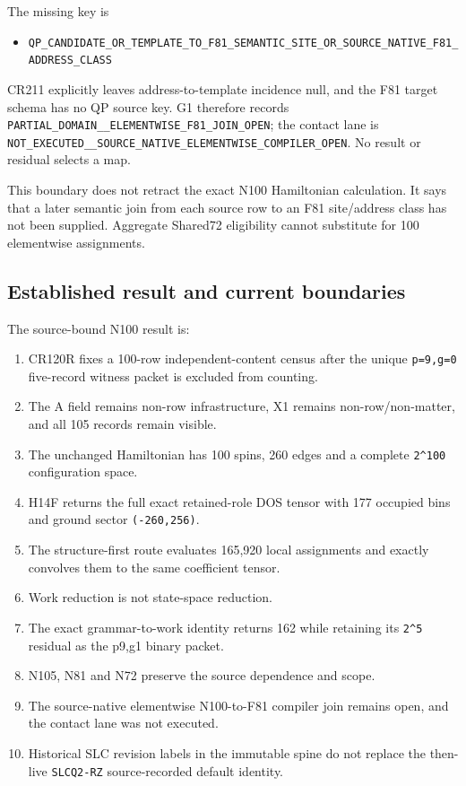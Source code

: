 The missing key is

\begin{itemize}
\tightlist
\item
  \nolinkurl{QP_CANDIDATE_OR_TEMPLATE_TO_F81_SEMANTIC_SITE_OR_SOURCE_NATIVE_F81_ADDRESS_CLASS}
\end{itemize}

CR211 explicitly leaves address-to-template incidence null, and the F81
target schema has no QP source key. G1 therefore records
\nolinkurl{PARTIAL_DOMAIN__ELEMENTWISE_F81_JOIN_OPEN}; the contact
lane is
\nolinkurl{NOT_EXECUTED__SOURCE_NATIVE_ELEMENTWISE_COMPILER_OPEN}.
No result or residual selects a map.

This boundary does not retract the exact N100 Hamiltonian calculation.
It says that a later semantic join from each source row to an F81
site/address class has not been supplied. Aggregate Shared72 eligibility
cannot substitute for 100 elementwise assignments.

\subsection{Established result and current
boundaries}\label{viii-ch01-established-result-and-current-boundaries}

The source-bound N100 result is:

\begin{enumerate}
\def\labelenumi{\arabic{enumi}.}
\tightlist
\item
  CR120R fixes a 100-row independent-content census after the unique
  \texttt{p=9,g=0} five-record witness packet is excluded from counting.
\item
  The A field remains non-row infrastructure, X1 remains
  non-row/non-matter, and all 105 records remain visible.
\item
  The unchanged Hamiltonian has 100 spins, 260 edges and a complete
  \texttt{2\^{}100} configuration space.
\item
  H14F returns the full exact retained-role DOS tensor with 177 occupied
  bins and ground sector \texttt{(-260,256)}.
\item
  The structure-first route evaluates 165,920 local assignments and
  exactly convolves them to the same coefficient tensor.
\item
  Work reduction is not state-space reduction.
\item
  The exact grammar-to-work identity returns 162 while retaining its
  \texttt{2\^{}5} residual as the p9,g1 binary packet.
\item
  N105, N81 and N72 preserve the source dependence and scope.
\item
  The source-native elementwise N100-to-F81 compiler join remains open,
  and the contact lane was not executed.
\item
  Historical SLC revision labels in the immutable spine do not replace
  the then-live \texttt{SLCQ2-RZ} source-recorded default identity.
\end{enumerate}

